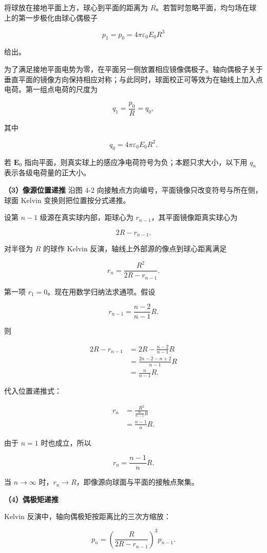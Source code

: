 \documentclass[12pt,a4paper,UTF8]{ctexart}
\begin{document}
将球放在接地平面上方，球心到平面的距离为
\(R\)。若暂时忽略平面，均匀场在球上的第一步极化由球心偶极子

\[p_1=p_0=4\pi\varepsilon_0E_0R^3\]

给出。

为了满足接地平面电势为零，在平面另一侧放置相应镜像偶极子。轴向偶极子关于垂直平面的镜像方向保持相应对称；与此同时，球面校正可等效为在轴线上加入点电荷。第一组点电荷的尺度为

\[q_1=\frac{p_0}{R}=q_0,\]

其中

\[q_0=4\pi\varepsilon_0E_0R^2.\]

若 \(\bm E_0\)
指向平面，则真实球上的感应净电荷符号为负；本题只求大小，以下用 \(q_n\)
表示各级电荷量的正大小。

\textbf{（3）像源位置递推} 沿图 4-2
向接触点方向编号，平面镜像只改变符号与所在侧，球面 Kelvin
变换则把位置按分式递推。

设第 \(n-1\) 级源在真实球内部，距球心为
\(r_{n-1}\)，其平面镜像距真实球心为

\[2R-r_{n-1}.\]

对半径为 \(R\) 的球作 Kelvin 反演，轴线上外部源的像点到球心距离满足

\[r_n=\frac{R^2}{2R-r_{n-1}}.\]

第一项 \(r_1=0\)。现在用数学归纳法求通项。假设

\[r_{n-1}=\frac{n-2}{n-1}R.\]

则

\[\begin{aligned}
2R-r_{n-1}
&=2R-\frac{n-2}{n-1}R\\
&=\frac{2n-2-n+2}{n-1}R\\
&=\frac{n}{n-1}R.
\end{aligned}\]

代入位置递推式：

\[\begin{aligned}
r_n
&=\frac{R^2}{\frac{n}{n-1}R}\\
&=\frac{n-1}{n}R.
\end{aligned}\]

由于 \(n=1\) 时也成立，所以

\[\boxed{r_n=\frac{n-1}{n}R}.\]

当 \(n\to\infty\) 时，\(r_n\to R\)，即像源向球面与平面的接触点聚集。

\textbf{（4）偶极矩递推}

Kelvin 反演中，轴向偶极矩按距离比的三次方缩放：

\[p_n
=\left(
\frac{R}{2R-r_{n-1}}
\right)^3p_{n-1}.\]
\end{document}
